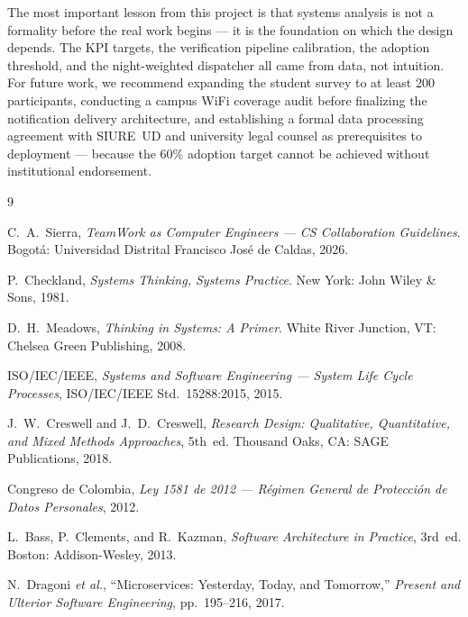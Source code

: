 \documentclass[10pt,twocolumn]{article}
\begin{document}
The most important lesson from this project is that systems analysis is not a
formality before the real work begins --- it is the foundation on which the design
depends. The KPI targets, the verification pipeline calibration, the adoption
threshold, and the night-weighted dispatcher all came from data, not intuition.
For future work, we recommend expanding the student survey to at least 200
participants, conducting a campus WiFi coverage audit before finalizing the
notification delivery architecture, and establishing a formal data processing
agreement with SIURE~UD and university legal counsel as prerequisites to
deployment --- because the 60\% adoption target cannot be achieved without
institutional endorsement.

\begin{thebibliography}{9}

C.~A.~Sierra,
\textit{TeamWork as Computer Engineers --- CS Collaboration Guidelines}.
Bogot\'a: Universidad Distrital Francisco Jos\'e de Caldas, 2026.

P.~Checkland,
\textit{Systems Thinking, Systems Practice}.
New York: John Wiley \& Sons, 1981.

D.~H.~Meadows,
\textit{Thinking in Systems: A Primer}.
White River Junction, VT: Chelsea Green Publishing, 2008.

ISO/IEC/IEEE,
\textit{Systems and Software Engineering --- System Life Cycle Processes},
ISO/IEC/IEEE Std.~15288:2015, 2015.

J.~W.~Creswell and J.~D.~Creswell,
\textit{Research Design: Qualitative, Quantitative, and Mixed Methods Approaches},
5th~ed. Thousand Oaks, CA: SAGE Publications, 2018.

Congreso de Colombia,
\textit{Ley 1581 de 2012 --- R\'egimen General de Protecci\'on de Datos Personales},
2012.

L.~Bass, P.~Clements, and R.~Kazman,
\textit{Software Architecture in Practice}, 3rd~ed.
Boston: Addison-Wesley, 2013.

N.~Dragoni \textit{et al.},
``Microservices: Yesterday, Today, and Tomorrow,''
\textit{Present and Ulterior Software Engineering},
pp.~195--216, 2017.

\end{thebibliography}
\end{document}
